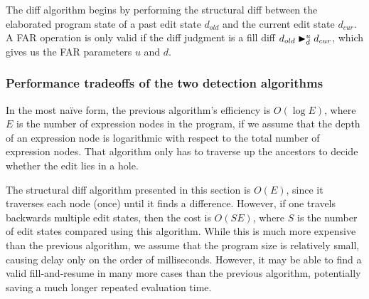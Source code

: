 \begin{singlespace}
\end{singlespace}


The diff algorithm begins by performing the structural diff between the elaborated program state of a past edit state $d_{old}$ and the current edit state $d_{cur}$. A FAR operation is only valid if the diff judgment is a fill diff $\fdiff{d_{old}}{d_{cur}}{u}{d}$, which gives us the FAR parameters $u$ and $d$.

\subsubsection{Performance tradeoffs of the two detection algorithms}
\label{sec:far-detect-compare}

In the most na\"ive form, the previous algorithm's efficiency is $O(\log E)$, where $E$ is the number of expression nodes in the program, if we assume that the depth of an expression node is logarithmic with respect to the total number of expression nodes. That algorithm only has to traverse up the ancestors to decide whether the edit lies in a hole.

The structural diff algorithm presented in this section is $O(E)$, since it traverses each node (once) until it finds a difference. However, if one travels backwards multiple edit states, then the cost is $O(SE)$, where $S$ is the number of edit states compared using this algorithm. While this is much more expensive than the previous algorithm, we assume that the program size is relatively small, causing delay only on the order of milliseconds. However, it may be able to find a valid fill-and-resume in many more cases than the previous algorithm, potentially saving a much longer repeated evaluation time.

